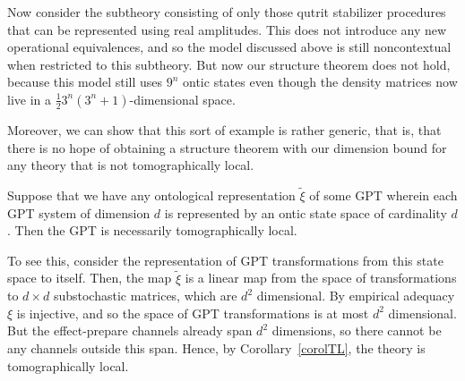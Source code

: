 \documentclass[10pt,twocolumn,aps,groupedaddress,nofootinbib]{revtex4}
\newcommand\Op{\mathsf{Op}}
\begin{document}
Now consider the subtheory consisting of only those qutrit stabilizer procedures that can be represented using real amplitudes. This does not introduce any new operational equivalences, and so the model discussed above is still noncontextual when restricted to this subtheory. But now our structure theorem does not hold, because this model still uses $9^n$ ontic states even though the density matrices now live in a $\frac12 3^n(3^n+1)$-dimensional space.

Moreover, we can show that this sort of example is rather generic, that is, that there is no hope of obtaining a structure theorem with our dimension bound for any theory that is not tomographically local. 

Suppose that we have any ontological representation $\widetilde{\xi}$ of some GPT wherein each GPT system of dimension $d$ is represented by an ontic state space of cardinality $d$. Then the GPT is necessarily tomographically local.

To see this, consider the representation of GPT transformations from this state space to itself. Then, the map $\widetilde{\xi}$ is a linear map from the space of transformations to
$d\times d$ substochastic matrices, which are $d^2$ dimensional. By empirical
adequacy $\xi$ is injective, and so the space of GPT transformations is at most $d^2$
dimensional. But the effect-prepare channels already span $d^2$
dimensions, so there cannot be any channels outside this span. Hence,
by Corollary~\ref{corolTL}, the theory is tomographically local.

\end{document}
